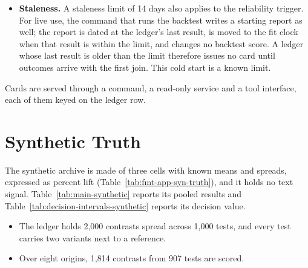 \begin{itemize}
\item \textbf{Staleness.} A staleness limit of 14 days also applies to the reliability trigger. For live use, the command that runs the backtest writes a starting report as well; the report is dated at the ledger's last result, is moved to the fit clock when that result is within the limit, and changes no backtest score. A ledger whose last result is older than the limit therefore issues no card until outcomes arrive with the first join. This cold start is a known limit.
\end{itemize}
Cards are served through a command, a read-only service and a tool interface, each of them keyed on the ledger row.



\section{Synthetic Truth}
\label{app:synthetic}
The synthetic archive is made of three cells with known means and spreads, expressed as percent lift (Table~\ref{tab:fmt-app-syn-truth}), and it holds no text signal.
Table~\ref{tab:main-synthetic} reports its pooled results and Table~\ref{tab:decision-intervals-synthetic} reports its decision value.
\begin{itemize}
\item The ledger holds 2,000 contrasts spread across 1,000 tests, and every test carries two variants next to a reference.
\item Over eight origins, 1,814 contrasts from 907 tests are scored.
\end{itemize}

\begin{table}[tp]\centering\scriptsize
\caption{For the synthetic archive, the generator's truth is set against the prior's fit of each cell on its own, with no pooling across cells, made once on the odd-numbered and once on the even-numbered tests. The halves hold the rows admitted to the ledger that the fit reads. The rows are the cells. The columns give the true cell mean and standard deviation in percent lift, both fits of each, and how many rows fall in each half. A fitted standard deviation is that of the fitted density: the scale itself for a normal fit, and the scale times $\sqrt{\nu/(\nu-2)}$ for a Student-t fit with $\nu$ degrees of freedom. The values are point estimates, with no intervals.}
\label{tab:fmt-app-syn-truth}
\resizebox{\columnwidth}{!}{}
\end{table}

